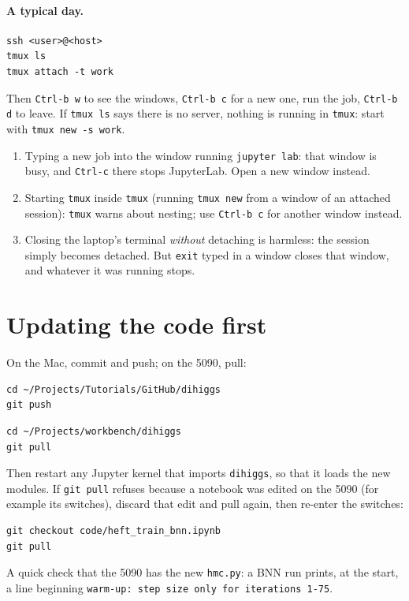\documentclass[11pt]{article}
\newcommand{\file}[1]{\nolinkurl{#1}}
\newcommand{\code}[1]{\texttt{#1}}
\begin{document}
\paragraph{A typical day.}
\begin{lstlisting}[style=sh]
ssh <user>@<host>
tmux ls
tmux attach -t work
\end{lstlisting}
\noindent Then \code{Ctrl-b w} to see the windows, \code{Ctrl-b c} for a new one, run the job,
\code{Ctrl-b d} to leave. If \code{tmux ls} says there is no server, nothing is running in
\code{tmux}: start with \code{tmux new -s work}.

\begin{watch}
\begin{enumerate}
  \item Typing a new job into the window running \code{jupyter lab}: that window is busy, and
    \code{Ctrl-c} there stops JupyterLab. Open a new window instead.
  \item Starting \code{tmux} inside \code{tmux} (running \code{tmux new} from a window of an
    attached session): \code{tmux} warns about nesting; use \code{Ctrl-b c} for another
    window instead.
  \item Closing the laptop's terminal \emph{without} detaching is harmless: the session
    simply becomes detached. But \code{exit} typed in a window closes that window, and
    whatever it was running stops.
\end{enumerate}
\end{watch}

\section{Updating the code first}

On the Mac, commit and push; on the 5090, pull:
\begin{lstlisting}[style=sh]
cd ~/Projects/Tutorials/GitHub/dihiggs
git push
\end{lstlisting}
\begin{lstlisting}[style=sh]
cd ~/Projects/workbench/dihiggs
git pull
\end{lstlisting}
Then restart any Jupyter kernel that imports \code{dihiggs}, so that it loads the new
modules. If \code{git pull} refuses because a notebook was edited on the 5090 (for example
its switches), discard that edit and pull again, then re-enter the switches:
\begin{lstlisting}[style=sh]
git checkout code/heft_train_bnn.ipynb
git pull
\end{lstlisting}
A quick check that the 5090 has the new \file{hmc.py}: a BNN run prints, at the start, a
line beginning \code{warm-up: step size only for iterations 1-75}.
\end{document}
